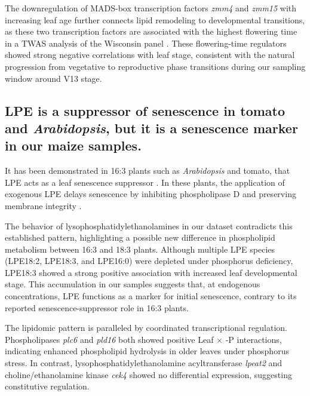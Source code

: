 \documentclass[9pt,twocolumn,twoside]{rilabRxiv}
\begin{document}
The downregulation of MADS-box transcription factors \textit{zmm4} and \textit{zmm15} with increasing leaf age further connects lipid remodeling to developmental transitions, as these two transcription factors are associated with the highest flowering time in a TWAS analysis of the Wisconsin panel \cite{torres-rodriguez2024}.
These flowering-time regulators showed strong negative correlations with leaf stage, consistent with the natural progression from vegetative to reproductive phase transitions during our sampling window around V13 stage.

\subsection*{LPE is a suppressor of senescence in tomato and \textit{Arabidopsis}, but it is a senescence marker in our maize samples.}

 It has been demonstrated in 16:3 plants such as \textit{Arabidopsis} and tomato, that LPE acts as a leaf senescence suppressor \cite{amaro2013}. 
 In these plants, the application of exogenous LPE delays senescence by inhibiting phospholipase D and preserving membrane integrity \cite{amaro2013,ryu1997}.
 
The behavior of lysophosphatidylethanolamines in our dataset contradicts this established pattern, highlighting a possible new difference in phospholipid metabolism between 16:3 and 18:3 plants.
Although multiple LPE species (LPE18:2, LPE18:3, and LPE16:0) were depleted under phosphorus deficiency, LPE18:3 showed a strong positive association with increased leaf developmental stage. 
This accumulation in our samples suggests that, at endogenous concentrations, LPE functions as a marker for initial senescence, contrary to its reported senescence-suppressor role in 16:3 plants.

The lipidomic pattern is paralleled by coordinated transcriptional regulation.
Phospholipases \textit{plc6} and \textit{pld16} both showed positive Leaf $\times$ -P interactions, indicating enhanced phospholipid hydrolysis in older leaves under phosphorus stress.
In contrast, lysophosphatidylethanolamine acyltransferase \textit{lpeat2} and choline/ethanolamine kinase \textit{cek4} showed no differential expression, suggesting constitutive regulation.
\end{document}
